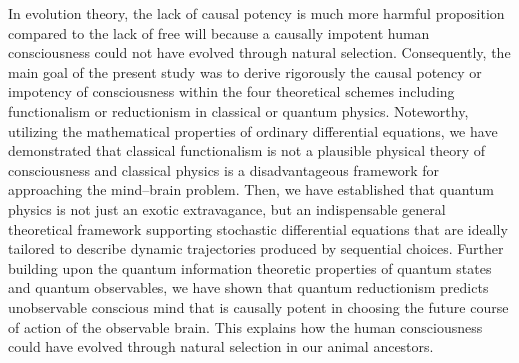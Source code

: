 \documentclass{ws-ijmpb}
\begin{document}
In evolution theory, the lack of causal potency is much more harmful
proposition compared to the lack of free will because a causally impotent
human consciousness could not have evolved through natural selection.
Consequently, the main goal of the present study was to derive rigorously
the causal potency or impotency of consciousness within the four theoretical
schemes including functionalism or reductionism in classical or quantum physics.
Noteworthy, utilizing the mathematical properties of ordinary differential equations,
we have demonstrated that classical functionalism is not a plausible
physical theory of consciousness and classical physics is a disadvantageous
framework for approaching the mind--brain problem. Then, we have established
that quantum physics is not just an exotic extravagance, but an indispensable general
theoretical framework supporting stochastic differential equations
that are ideally tailored to describe dynamic trajectories produced
by sequential choices. Further building upon the quantum information
theoretic properties of quantum states and quantum observables, we
have shown that quantum reductionism predicts unobservable conscious
mind that is causally potent in choosing the future course of action
of the observable brain. This explains how the human consciousness
could have evolved through natural selection in our animal ancestors.

\end{document}
